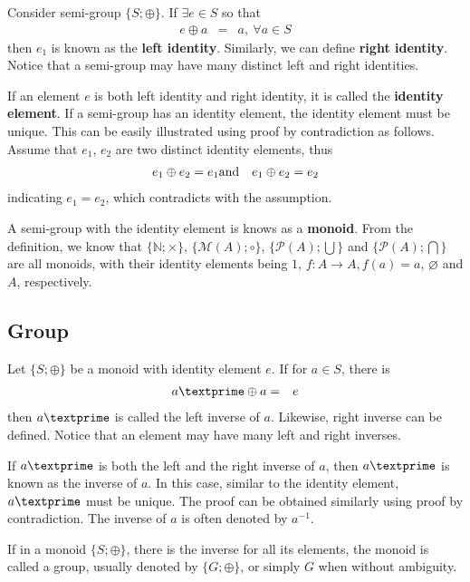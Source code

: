 Consider semi-group $\{S; \oplus\}$. If $\exists e\in S$ so that
\begin{eqnarray}
	e\oplus a &=& a, ~\forall a \in S \nonumber
\end{eqnarray}
then $e_1$ is known as the \textbf{left identity}. Similarly, we can define \textbf{right identity}. Notice that a semi-group may have many distinct left and right identities.

If an element $e$ is both left identity and right identity, it is called the \textbf{identity element}. If a semi-group has an identity element, the identity element must be unique. This can be easily illustrated using proof by contradiction as follows. Assume that $e_1$, $e_2$ are two distinct identity elements, thus
\begin{eqnarray}
	e_1\oplus e_2 = e_1 &\textup{and}& e_1\oplus e_2 = e_2 \nonumber
\end{eqnarray}
indicating $e_1=e_2$, which contradicts with the assumption.

A semi-group with the identity element is knows as a \textbf{monoid}. From the definition, we know that $\{\mathbb{N}; \times\}$, $\{\mathcal{M}(A); \circ\}$, $\{\mathcal{P}(A); \bigcup\}$ and $\{\mathcal{P}(A); \bigcap\}$ are all monoids, with their identity elements being $1$, $f: A\rightarrow A, f(a)=a$, $\varnothing$ and $A$, respectively.

\subsection{Group}

Let $\{S; \oplus\}$ be a monoid with identity element $e$. If for $a\in S$, there is
\begin{eqnarray}
	a\textprime \oplus a &=& e \nonumber
\end{eqnarray}
then $a\textprime$ is called the left inverse of $a$. Likewise, right inverse can be defined. Notice that an element may have many left and right inverses.

If $a\textprime$ is both the left and the right inverse of $a$, then $a\textprime$ is known as the inverse of $a$. In this case, similar to the identity element, $a\textprime$ must be unique. The proof can be obtained similarly using proof by contradiction. The inverse of $a$ is often denoted by $a^{-1}$.

If in a monoid $\{S; \oplus\}$, there is the inverse for all its elements, the monoid is called a group, usually denoted by $\{G; \oplus\}$, or simply $G$ when without ambiguity.

